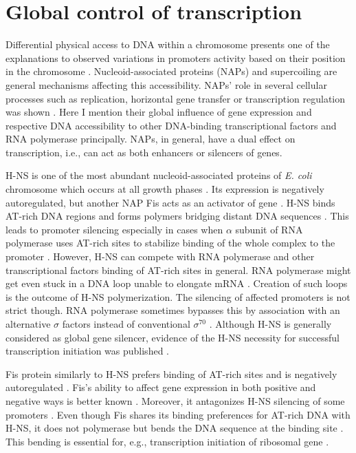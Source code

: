 \section{Global control of transcription}
Differential physical access to DNA within a chromosome presents one of the explanations to observed variations in promoters activity based on their position in the chromosome \cite{bryant2014chromosome}.
Nucleoid-associated proteins (NAPs) and supercoiling are general mechanisms affecting this accessibility.
NAPs' role in several cellular processes such as replication, horizontal gene transfer or transcription regulation was shown \cite{dixon1984protein, kayoko1992histone, aznar2013hha}.
Here I mention their global influence of gene expression and respective DNA accessibility to other DNA-binding transcriptional factors and RNA polymerase principally.
NAPs, in general, have a dual effect on transcription, i.e., can act as both enhancers or silencers of genes.

H-NS is one of the most abundant nucleoid-associated proteins of \textit{E. coli} chromosome which occurs at all growth phases \cite{azam1999growth}.
Its expression is negatively autoregulated, but another NAP Fis acts as an activator of  gene \cite{ueguchi1993autoregulatory, falconi1996antagonistic}.
H-NS binds AT-rich DNA regions and forms polymers bridging distant DNA sequences  \cite{navarre2006selective, arold2010h}.
This leads to promoter silencing especially in cases when $\alpha$ subunit of RNA polymerase uses AT-rich sites to stabilize binding of the whole complex to the promoter \cite{singh2013h}.
However, H-NS can compete with RNA polymerase and other transcriptional factors binding of AT-rich sites in general.
RNA polymerase might get even stuck in a DNA loop unable to elongate mRNA \cite{dame2002structural}.
Creation of such loops is the outcome of H-NS polymerization.
The silencing of affected promoters is not strict though.
RNA polymerase sometimes bypasses this by association with an alternative $\sigma$ factors instead of conventional $\sigma^{70}$ \cite{grainger2008selective}.
Although H-NS is generally considered as global gene silencer, evidence of the H-NS necessity for successful transcription initiation was published \cite{singh2013h}.

Fis protein similarly to H-NS prefers binding of AT-rich sites and is negatively autoregulated \cite{ball1992dramatic, stella2010shape}.
Fis's ability to affect gene expression in both positive and negative ways is better known \cite{choi2005effects, karambelkar2012silencing}.
Moreover, it antagonizes H-NS silencing of some promoters \cite{falconi2001involvement}.
Even though Fis shares its binding preferences for AT-rich DNA with H-NS, it does not polymerase but bends the DNA sequence at the binding site \cite{hubner1989bent}.
This bending is essential for, e.g., transcription initiation of ribosomal gene  \cite{gosink1993dna}.


